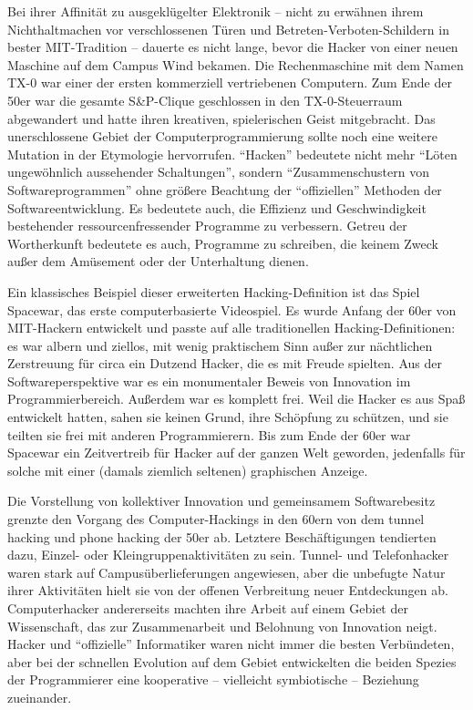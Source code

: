 Bei ihrer Affinität zu ausgeklügelter Elektronik – nicht zu erwähnen ihrem Nichthaltmachen vor verschlossenen Türen und Betreten-Verboten-Schildern in bester MIT-Tradition – dauerte es nicht lange, bevor die Hacker von einer neuen Maschine auf dem Campus Wind bekamen. Die Rechenmaschine mit dem Namen TX-0 war einer der ersten kommerziell vertriebenen Computern. Zum Ende der 50er war die gesamte S\&P-Clique geschlossen in den TX-0-Steuerraum abgewandert und hatte ihren kreativen, spielerischen Geist mitgebracht.
Das unerschlossene Gebiet der Computerprogrammierung sollte noch eine weitere Mutation in der Etymologie hervorrufen. "`Hacken"' bedeutete nicht mehr "`Löten ungewöhnlich aussehender Schaltungen"', sondern "`Zusammenschustern von Softwareprogrammen"' ohne größere Beachtung der "`offiziellen"' Methoden der Softwareentwicklung. Es bedeutete auch, die Effizienz und Geschwindigkeit bestehender ressourcenfressender Programme zu verbessern. Getreu der Wortherkunft bedeutete es auch, Programme zu schreiben, die keinem Zweck außer dem Amüsement oder der Unterhaltung dienen.

Ein klassisches Beispiel dieser erweiterten Hacking-Definition ist das Spiel Spacewar, das erste computerbasierte Videospiel. Es wurde Anfang der 60er von MIT-Hackern entwickelt und passte auf alle traditionellen Hacking-Definitionen: es war albern und ziellos, mit wenig praktischem Sinn außer zur nächtlichen Zerstreuung für circa ein Dutzend Hacker, die es mit Freude spielten. Aus der Softwareperspektive war es ein monumentaler Beweis von Innovation im Programmierbereich.
Außerdem war es komplett frei. Weil die Hacker es aus Spaß entwickelt hatten, sahen sie keinen Grund, ihre Schöpfung zu schützen, und sie teilten sie frei mit anderen Programmierern. Bis zum Ende der 60er war Spacewar ein Zeitvertreib für Hacker auf der ganzen Welt geworden, jedenfalls für solche mit einer (damals ziemlich seltenen) graphischen Anzeige.

Die Vorstellung von kollektiver Innovation und gemeinsamem Softwarebesitz grenzte den Vorgang des Computer-Hackings in den 60ern von dem tunnel hacking und phone hacking der 50er ab. Letztere Beschäftigungen tendierten dazu, Einzel- oder Kleingruppenaktivitäten zu sein. Tunnel- und Telefonhacker waren stark auf Campusüberlieferungen angewiesen, aber die unbefugte Natur ihrer Aktivitäten hielt sie von der offenen Verbreitung neuer Entdeckungen ab. Computerhacker andererseits machten ihre Arbeit auf einem Gebiet der Wissenschaft, das zur Zusammenarbeit und Belohnung von Innovation neigt. Hacker und "`offizielle"' Informatiker waren nicht immer die besten Verbündeten, aber bei der schnellen Evolution auf dem Gebiet entwickelten die beiden Spezies der Programmierer eine kooperative – vielleicht symbiotische – Beziehung zueinander.

